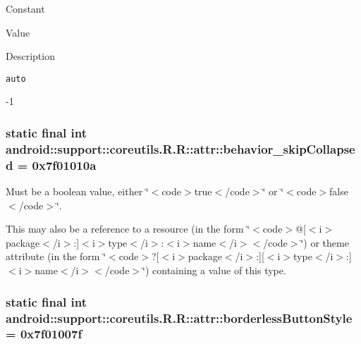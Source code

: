 Constant

Value

Description 

{\tt auto}

-1\hypertarget{classandroid_1_1support_1_1coreutils_1_1_r_1_1attr_e7c271f235bced005cd3ddf2511c40cf}{
\subsubsection[{behavior\_\-skipCollapsed}]{\setlength{\rightskip}{0pt plus 5cm}static final int android::support::coreutils.R.R::attr::behavior\_\-skipCollapsed = 0x7f01010a}}
\label{classandroid_1_1support_1_1coreutils_1_1_r_1_1attr_e7c271f235bced005cd3ddf2511c40cf}


Must be a boolean value, either \char`\"{}$<$code$>$true$<$/code$>$\char`\"{} or \char`\"{}$<$code$>$false$<$/code$>$\char`\"{}. 

This may also be a reference to a resource (in the form \char`\"{}$<$code$>$@\mbox{[}$<$i$>$package$<$/i$>$:\mbox{]}$<$i$>$type$<$/i$>$:$<$i$>$name$<$/i$>$$<$/code$>$\char`\"{}) or theme attribute (in the form \char`\"{}$<$code$>$?\mbox{[}$<$i$>$package$<$/i$>$:\mbox{]}\mbox{[}$<$i$>$type$<$/i$>$:\mbox{]}$<$i$>$name$<$/i$>$$<$/code$>$\char`\"{}) containing a value of this type. \hypertarget{classandroid_1_1support_1_1coreutils_1_1_r_1_1attr_fbd7927eb3ad6d97cae2d7f6d2603923}{
\subsubsection[{borderlessButtonStyle}]{\setlength{\rightskip}{0pt plus 5cm}static final int android::support::coreutils.R.R::attr::borderlessButtonStyle = 0x7f01007f}}
\label{classandroid_1_1support_1_1coreutils_1_1_r_1_1attr_fbd7927eb3ad6d97cae2d7f6d2603923}


